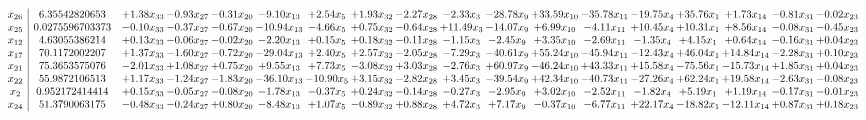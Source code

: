 \documentclass[9pt]{article}
\begin{document}
\[\begin{array}{c| c c@{\hskip 2pt} c@{\hskip 2pt} c@{\hskip 2pt} c@{\hskip 2pt} c@{\hskip 2pt} c@{\hskip 2pt} c@{\hskip 2pt} c@{\hskip 2pt} c@{\hskip 2pt} c@{\hskip 2pt} c@{\hskip 2pt} c@{\hskip 2pt} c@{\hskip 2pt} c@{\hskip 2pt} c@{\hskip 2pt} c@{\hskip 2pt} }
 x_{26}   &  6.35542820653 & +  1.38 x_{33} & -0.93 x_{27} & -0.31 x_{20} & -9.10 x_{13} & +  2.54 x_{5} & +  1.93 x_{32} & -2.27 x_{28} & -2.33 x_{3} & -28.78 x_{9} & + 33.59 x_{10} & -35.78 x_{11} & -19.75 x_{4} & + 35.76 x_{1} & +  1.73 x_{14} & -0.81 x_{31} & -0.02 x_{23}\\
 x_{25}   &  0.0275596703373 & -0.10 x_{33} & -0.37 x_{27} & -0.67 x_{20} & -10.94 x_{13} & -4.66 x_{5} & +  0.75 x_{32} & -0.64 x_{28} & + 11.49 x_{3} & -14.07 x_{9} & +  6.99 x_{10} & -4.11 x_{11} & + 10.45 x_{4} & + 10.31 x_{1} & +  8.56 x_{14} & -0.08 x_{31} & -0.45 x_{23}\\
 x_{12}   &  4.63055386214 & +  0.13 x_{33} & -0.06 x_{27} & -0.02 x_{20} & -2.20 x_{13} & +  0.15 x_{5} & +  0.18 x_{32} & -0.11 x_{28} & -1.15 x_{3} & -2.45 x_{9} & +  3.35 x_{10} & -2.69 x_{11} & -1.35 x_{4} & +  4.15 x_{1} & +  0.64 x_{14} & -0.16 x_{31} & +  0.04 x_{23}\\
 x_{17}   &  70.1172002207 & +  1.37 x_{33} & -1.60 x_{27} & -0.72 x_{20} & -29.04 x_{13} & +  2.40 x_{5} & +  2.57 x_{32} & -2.05 x_{28} & -7.29 x_{3} & -40.61 x_{9} & + 55.24 x_{10} & -45.94 x_{11} & -12.43 x_{4} & + 46.04 x_{1} & + 14.84 x_{14} & -2.28 x_{31} & +  0.10 x_{23}\\
 x_{21}   &  75.3653575076 & -2.01 x_{33} & +  1.08 x_{27} & +  0.75 x_{20} & +  9.55 x_{13} & +  7.73 x_{5} & -3.08 x_{32} & +  3.03 x_{28} & -2.76 x_{3} & + 60.97 x_{9} & -46.24 x_{10} & + 43.33 x_{11} & + 15.58 x_{4} & -75.56 x_{1} & -15.73 x_{14} & +  1.85 x_{31} & +  0.04 x_{23}\\
 x_{22}   &  55.9872106513 & +  1.17 x_{33} & -1.24 x_{27} & -1.83 x_{20} & -36.10 x_{13} & -10.90 x_{5} & +  3.15 x_{32} & -2.82 x_{28} & +  3.45 x_{3} & -39.54 x_{9} & + 42.34 x_{10} & -40.73 x_{11} & -27.26 x_{4} & + 62.24 x_{1} & + 19.58 x_{14} & -2.63 x_{31} & -0.08 x_{23}\\
 x_{2}   &  0.952172414414 & +  0.15 x_{33} & -0.05 x_{27} & -0.08 x_{20} & -1.78 x_{13} & -0.37 x_{5} & +  0.24 x_{32} & -0.14 x_{28} & -0.27 x_{3} & -2.95 x_{9} & +  3.02 x_{10} & -2.52 x_{11} & -1.82 x_{4} & +  5.19 x_{1} & +  1.19 x_{14} & -0.17 x_{31} & -0.01 x_{23}\\
 x_{24}   &  51.3790063175 & -0.48 x_{33} & -0.24 x_{27} & +  0.80 x_{20} & -8.48 x_{13} & +  1.07 x_{5} & -0.89 x_{32} & +  0.88 x_{28} & +  4.72 x_{3} & +  7.17 x_{9} & -0.37 x_{10} & -6.77 x_{11} & + 22.17 x_{4} & -18.82 x_{1} & -12.11 x_{14} & +  0.87 x_{31} & +  0.18 x_{23}\\

\end{array}\]
\end{document}
